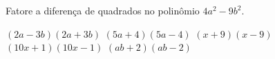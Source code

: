 Fatore a diferença de quadrados no polinômio $4a^2-9b^2$.

$(2a-3b)(2a+3b)$
$(5a+4)(5a-4)$
$(x+9)(x-9)$
$(10x+1)(10x-1)$
$(ab+2)(ab-2)$


